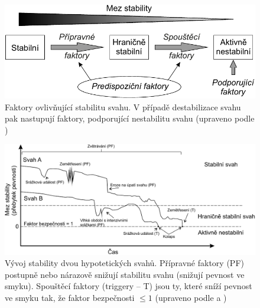 \begin{figure}[h]
	\centering
	\includegraphics[width=1\linewidth]{obrazky/slope/stability_diagram}
	\caption{Faktory ovlivňující stabilitu svahu. V případě destabilizace svahu pak nastupují faktory, podporující nestabilitu svahu (upraveno podle \textcite{gladeLandslideGeomorphologyChanging2010})}
	\label{fig:stability_diagram}
\end{figure}

\begin{figure}[h]
	\centering
	\includegraphics[width=1\linewidth]{obrazky/slope/time_stability}
	\caption{Vývoj stability dvou hypotetických svahů. Přípravné faktory (PF) postupně nebo nárazově snižují stabilitu svahu (snižují pevnost ve smyku). Spouštěcí faktory (triggery -- T) jsou ty, které sníží pevnost ve smyku tak, že faktor bezpečnosti $ \leq 1$ (upraveno podle \textcite{popescuSuggestedMethodReporting1994} a \textcite{mccollLandslideCausesTriggers2015})}
	\label{fig:timestability}
\end{figure}

